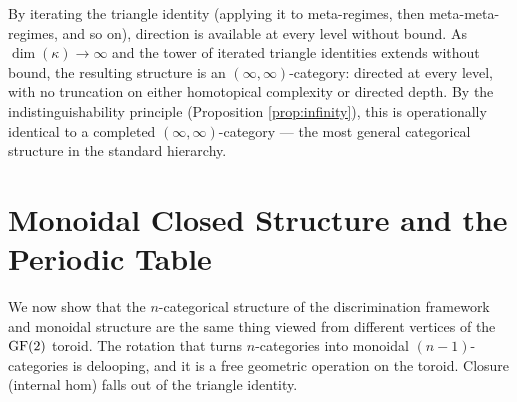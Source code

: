 \begin{remark}
By iterating the triangle identity (applying it to
meta-regimes, then meta-meta-regimes, and so on),
direction is available at every level without bound.
As $\dim(\kappa) \to \infty$ and the tower of
iterated triangle identities extends without bound,
the resulting structure is an $(\infty,\infty)$-category:
directed at every level, with no truncation on either
homotopical complexity or directed depth. By the
indistinguishability principle (Proposition
\ref{prop:infinity}), this is operationally identical
to a completed $(\infty,\infty)$-category --- the
most general categorical structure in the standard
hierarchy.
\end{remark}

\section{Monoidal Closed Structure and the Periodic Table}
\label{sec:monoidal}

We now show that the $n$-categorical structure of the
discrimination framework and monoidal structure are the
same thing viewed from different vertices of the $\operatorname{GF}(2)$
toroid. The rotation that turns $n$-categories into monoidal
$(n-1)$-categories is delooping, and it is a free geometric
operation on the toroid. Closure (internal hom) falls out of
the triangle identity.
